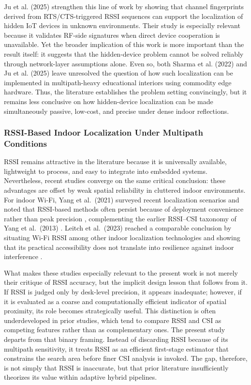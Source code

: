 Ju et al. (2025) strengthen this line of work by showing that channel fingerprints derived from RTS/CTS-triggered RSSI sequences can support the localization of hidden IoT devices in unknown environments. Their study is especially relevant because it validates RF-side signatures when direct device cooperation is unavailable. Yet the broader implication of this work is more important than the result itself: it suggests that the hidden-device problem cannot be solved reliably through network-layer assumptions alone. Even so, both Sharma et al. (2022) and Ju et al. (2025) leave unresolved the question of how such localization can be implemented in multipath-heavy educational interiors using commodity edge hardware. Thus, the literature establishes the problem setting convincingly, but it remains less conclusive on how hidden-device localization can be made simultaneously passive, low-cost, and precise under dense indoor reflections.

\subsubsection{RSSI-Based Indoor Localization Under Multipath Conditions}
RSSI remains attractive in the literature because it is universally available, lightweight to process, and easy to integrate into embedded systems. Nevertheless, recent studies converge on the same critical conclusion: these advantages are offset by weak spatial reliability in cluttered indoor environments. For indoor Wi-Fi, Yang et al.\ (2021) surveyed recent localization scenarios and noted that RSSI-based methods often persist because of deployment convenience rather than peak precision \cite{yang2021survey}, complementing the earlier RSSI--CSI taxonomy of Yang et al.\ (2013) \cite{yang2013rssi2csi}. Leitch et al.\ (2023) reached a comparable conclusion by situating Wi-Fi RSSI among other indoor localization technologies and showing that its practical accessibility does not translate into resilience against indoor interference \cite{leitch2023indoor}.

What makes these studies especially relevant to the present work is not merely their critique of RSSI accuracy, but the implicit design lesson that follows from it. If RSSI is judged only by desk-level precision, it appears inadequate; however, if it is evaluated as a coarse and computationally efficient indicator of spatial proximity, its role becomes strategically useful. This distinction is often underdeveloped in prior studies, which tend to compare RSSI and CSI as competing features rather than as complementary ones. The present study departs from that binary framing. Instead of discarding RSSI because of its multipath sensitivity, it treats RSSI as an efficient first-stage estimator that constrains the search area before finer CSI analysis is invoked. The gap, therefore, is not simply that RSSI is inaccurate, but that prior literature insufficiently theorizes its value within adaptive hybrid pipelines.

